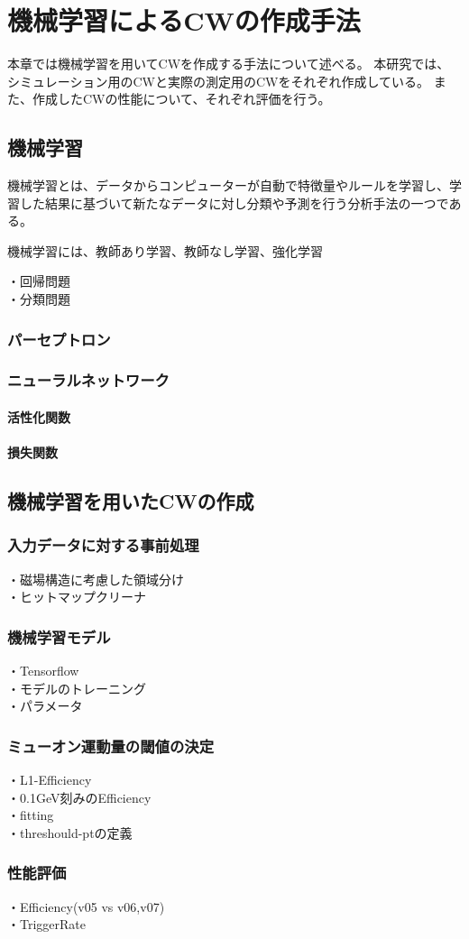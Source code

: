 \chapter{機械学習によるCWの作成手法}
本章では機械学習を用いてCWを作成する手法について述べる。
本研究では、シミュレーション用のCWと実際の測定用のCWをそれぞれ作成している。
また、作成したCWの性能について、それぞれ評価を行う。

\section{機械学習}
機械学習とは、データからコンピューターが自動で特徴量やルールを学習し、学習した結果に基づいて新たなデータに対し分類や予測を行う分析手法の一つである。

機械学習には、教師あり学習、教師なし学習、強化学習

・回帰問題\\
・分類問題
\subsection{パーセプトロン}

\subsection{ニューラルネットワーク}
\subsubsection{活性化関数}
\subsubsection{損失関数}

\section{機械学習を用いたCWの作成}
\subsection{入力データに対する事前処理}
・磁場構造に考慮した領域分け\\
・ヒットマップクリーナ
\subsection{機械学習モデル}
・Tensorflow\\
・モデルのトレーニング\\
・パラメータ
\subsection{ミューオン運動量の閾値の決定}
・L1-Efficiency\\
・0.1GeV刻みのEfficiency\\
・fitting\\
・threshould-ptの定義
\subsection{性能評価}
・Efficiency(v05 vs v06,v07)\\
・TriggerRate
